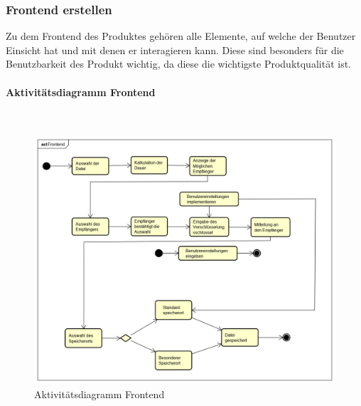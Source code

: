\subsubsection{Frontend erstellen}
Zu dem Frontend des Produktes gehören alle Elemente, auf welche der Benutzer Einsicht hat und mit denen er interagieren kann. Diese sind besonders für die Benutzbarkeit des Produkt wichtig, da diese die wichtigste Produktqualität ist.

\paragraph{Aktivitätsdiagramm Frontend}\mbox{}\\
\begin{figure}[H]
	\centering
	\includegraphics[width= 0.9\linewidth]{diagramms/activity/Frontend.png}
	\caption{Aktivitätsdiagramm Frontend}
\end{figure}
\newpage
